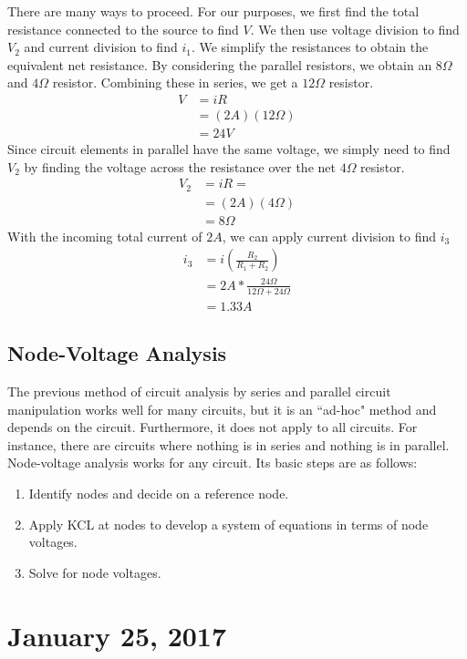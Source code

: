 \documentclass[11pt]{article}
\theoremstyle{plain} %
\theoremstyle{definition}
\theoremstyle{example}
\theoremstyle{remark}
\begin{document}
There are many ways to proceed. For our purposes, we first find the total resistance connected to the source to find $V$. We then use voltage division to find $V_2$ and current division to find $i_1$. We simplify the resistances to obtain the equivalent net resistance. By considering the parallel resistors, we obtain an $8\Omega$ and $4\Omega$ resistor. Combining these in series, we get a $12\Omega$ resistor. 
\begin{align*}
V &= iR \\
&= (2A)(12\Omega)\\
&= 24V
\end{align*} Since circuit elements in parallel have the same voltage, we simply need to find $V_2$ by finding the voltage across the resistance over the net $4\Omega$ resistor. 
\begin{align*}
V_2 &= iR = \\
&= (2A)(4\Omega)\\
&= 8\Omega
\end{align*}
With the incoming total current of $2A$, we can apply current division to find $i_3$
\begin{align*}
i_3 &= i\left( \frac{R_2}{R_1+R_2}\right)\\
&= 2A*\frac{24\Omega}{12\Omega + 24\Omega}\\
&= 1.33A
\end{align*}


\subsection{Node-Voltage Analysis}

The previous method of circuit analysis by series and parallel circuit manipulation works well for many circuits, but it is an ``ad-hoc" method and depends on the circuit. Furthermore, it does not apply to all circuits. For instance, there are circuits where nothing is in series and nothing is in parallel. Node-voltage analysis works for any circuit. Its basic steps are as follows:

\begin{enumerate}
	\item Identify nodes and decide on a reference node.
	\item Apply KCL at nodes to develop a system of equations in terms of node voltages.
	\item Solve for node voltages. 
\end{enumerate}

\section{January 25, 2017}
\end{document}
